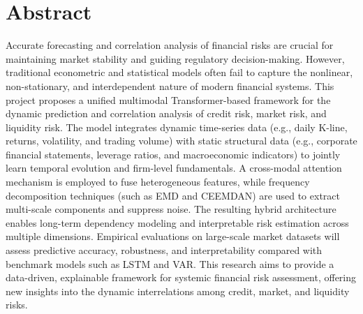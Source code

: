 \section{Abstract}
\label{sec:Abstract}
Accurate forecasting and correlation analysis of financial risks are crucial for maintaining market stability and guiding regulatory decision-making. However, traditional econometric and statistical models often fail to capture the nonlinear, non-stationary, and interdependent nature of modern financial systems. This project proposes a unified multimodal Transformer-based framework for the dynamic prediction and correlation analysis of credit risk, market risk, and liquidity risk. The model integrates dynamic time-series data (e.g., daily K-line, returns, volatility, and trading volume) with static structural data (e.g., corporate financial statements, leverage ratios, and macroeconomic indicators) to jointly learn temporal evolution and firm-level fundamentals. A cross-modal attention mechanism is employed to fuse heterogeneous features, while frequency decomposition techniques (such as EMD and CEEMDAN) are used to extract multi-scale components and suppress noise. The resulting hybrid architecture enables long-term dependency modeling and interpretable risk estimation across multiple dimensions. Empirical evaluations on large-scale market datasets will assess predictive accuracy, robustness, and interpretability compared with benchmark models such as LSTM and VAR. This research aims to provide a data-driven, explainable framework for systemic financial risk assessment, offering new insights into the dynamic interrelations among credit, market, and liquidity risks.